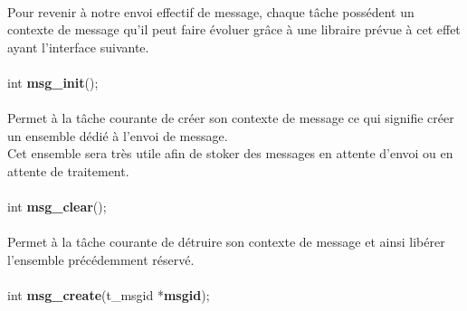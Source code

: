 \documentclass[10pt,a4wide]{article}
\begin{document}
\paragraph{}

Pour revenir \`a notre envoi effectif de message, chaque t\^ache poss\'edent un contexte de message qu'il peut faire \'evoluer
gr\^ace \`a une libraire pr\'evue \`a cet effet ayant l'interface suivante.

\paragraph{}

\hspace{1.5cm}int \textbf{msg\_init}();

\paragraph{}

Permet \`a la t\^ache courante de cr\'eer son contexte de message ce qui signifie cr\'eer un ensemble d\'edi\'e \`a l'envoi de
message.\\
Cet ensemble sera tr\`es utile afin de stoker des messages en attente d'envoi ou en attente de traitement.

\paragraph{}

\hspace{1.5cm}int \textbf{msg\_clear}();

\paragraph{}

Permet \`a la t\^ache courante de d\'etruire son contexte de message et ainsi lib\'erer l'ensemble pr\'ec\'edemment r\'eserv\'e.

\paragraph{}

\hspace{1.5cm}int \textbf{msg\_create}(t\_msgid *\textbf{msgid});

\paragraph{}
\end{document}
